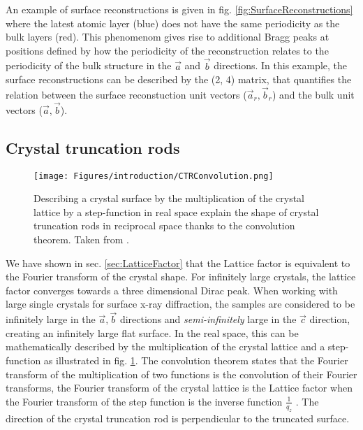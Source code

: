 An example of surface reconstructions is given in fig. \ref{fig:SurfaceReconstructions} where the latest atomic layer (blue) does not have the same periodicity as the bulk layers (red).
This phenomenom gives rise to additional Bragg peaks at positions defined by how the periodicity of the reconstruction relates to the periodicity of the bulk structure in the $\vec{a}$ and $\vec{b}$ directions.
In this example, the surface reconstructions can be described by the (2, 4) matrix, that quantifies the relation between the surface reconstuction unit vectors ($\vec{a}_r, \vec{b}_r$) and the bulk unit vectors ($\vec{a}, \vec{b}$).

\subsection{Crystal truncation rods} \label{sec:CTR}

\begin{figure}[!htb]
    \centering
    \texttt{[image: Figures/introduction/CTRConvolution.png]}
    \caption{
    Describing a crystal surface by the multiplication of the crystal lattice by a step-function in real space explain the shape of crystal truncation rods in reciprocal space thanks to the convolution theorem.
    Taken from \cite{Willmott}.
    }
    \label{fig:CTRConvolution}
\end{figure}

We have shown in sec. \ref{sec:LatticeFactor} that the Lattice factor is equivalent to the Fourier transform of the crystal shape.
For infinitely large crystals, the lattice factor converges towards a three dimensional Dirac peak.
When working with large single crystals for surface x-ray diffraction, the samples are considered to be infinitely large in the $\vec{a}, \vec{b}$ directions and \textit{semi-infinitely} large in the $\vec{c}$ direction, creating an infinitely large flat surface.
In the real space, this can be mathematically described by the multiplication of the crystal lattice and a step-function as illustrated in fig. \ref{fig:CTRConvolution}.
The convolution theorem states that the Fourier transform of the multiplication of two functions is the convolution of their Fourier transforms, the Fourier transform of the crystal lattice is the Lattice factor when the Fourier transform of the step function is the inverse function $\frac{1}{q_z}$ \parencite{Andrews1985, Robinson1986}.
The direction of the crystal truncation rod is perpendicular to the truncated surface.

